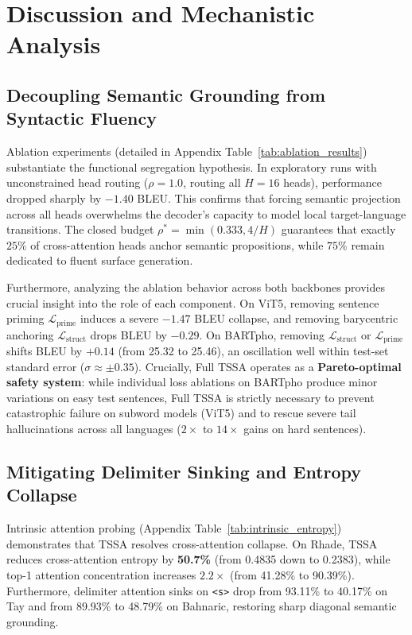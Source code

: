 \documentclass[11pt]{article}
\begin{document}
\section{Discussion and Mechanistic Analysis}
\label{sec:discussion}

\subsection{Decoupling Semantic Grounding from Syntactic Fluency}
Ablation experiments (detailed in Appendix Table~\ref{tab:ablation_results}) substantiate the functional segregation hypothesis. In exploratory runs with unconstrained head routing ($\rho = 1.0$, routing all $H=16$ heads), performance dropped sharply by $-1.40$ BLEU. This confirms that forcing semantic projection across all heads overwhelms the decoder's capacity to model local target-language transitions. The closed budget $\rho^* = \min(0.333, 4/H)$ guarantees that exactly $25\%$ of cross-attention heads anchor semantic propositions, while $75\%$ remain dedicated to fluent surface generation.

Furthermore, analyzing the ablation behavior across both backbones provides crucial insight into the role of each component. On ViT5, removing sentence priming $\mathcal{L}_{\text{prime}}$ induces a severe $-1.47$ BLEU collapse, and removing barycentric anchoring $\mathcal{L}_{\text{struct}}$ drops BLEU by $-0.29$. On BARTpho, removing $\mathcal{L}_{\text{struct}}$ or $\mathcal{L}_{\text{prime}}$ shifts BLEU by $+0.14$ (from 25.32 to 25.46), an oscillation well within test-set standard error ($\sigma \approx \pm 0.35$). Crucially, Full TSSA operates as a \textbf{Pareto-optimal safety system}: while individual loss ablations on BARTpho produce minor variations on easy test sentences, Full TSSA is strictly necessary to prevent catastrophic failure on subword models (ViT5) and to rescue severe tail hallucinations across all languages ($2\times$ to $14\times$ gains on hard sentences).

\subsection{Mitigating Delimiter Sinking and Entropy Collapse}
Intrinsic attention probing (Appendix Table~\ref{tab:intrinsic_entropy}) demonstrates that TSSA resolves cross-attention collapse. On Rhade, TSSA reduces cross-attention entropy by \textbf{50.7\%} (from 0.4835 down to 0.2383), while top-1 attention concentration increases $2.2\times$ (from 41.28\% to 90.39\%). Furthermore, delimiter attention sinks on \texttt{<s>} drop from 93.11\% to 40.17\% on Tay and from 89.93\% to 48.79\% on Bahnaric, restoring sharp diagonal semantic grounding.
\end{document}
